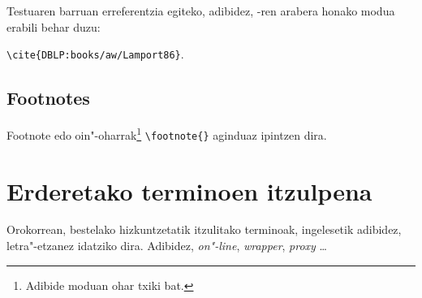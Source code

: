 Testuaren barruan erreferentzia egiteko, adibidez, \cite{DBLP:books/aw/Lamport86}-ren arabera honako modua erabili behar duzu:  

\verb+\cite{DBLP:books/aw/Lamport86}+.


\subsection{Footnotes}
\label{azpiatala:oin-oharrak}

Footnote edo oin"-oharrak\footnote{Adibide moduan ohar txiki bat.} \verb+\footnote{}+ aginduaz ipintzen dira.



\section{Erderetako terminoen itzulpena}
\label{azpiatala:erdarak}

Orokorrean, bestelako hizkuntzetatik itzulitako terminoak, ingelesetik adibidez, letra"-etzanez idatziko dira. Adibidez, \emph{on"-line}, \emph{wrapper}, \emph{proxy} \ldots

























